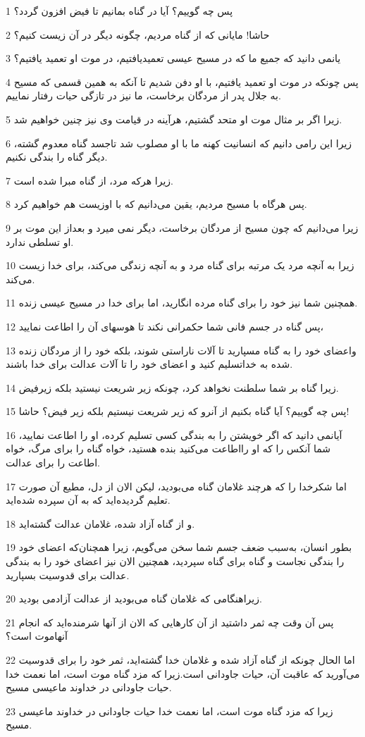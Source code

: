 \par 1 پس چه گوییم؟ آیا در گناه بمانیم تا فیض افزون گردد؟
\par 2 حاشا! مایانی که از گناه مردیم، چگونه دیگر در آن زیست کنیم؟
\par 3 یانمی دانید که جمیع ما که در مسیح عیسی تعمیدیافتیم، در موت او تعمید یافتیم؟
\par 4 پس چونکه در موت او تعمید یافتیم، با او دفن شدیم تا آنکه به همین قسمی که مسیح به جلال پدر از مردگان برخاست، ما نیز در تازگی حیات رفتار نماییم.
\par 5 زیرا اگر بر مثال موت او متحد گشتیم، هرآینه در قیامت وی نیز چنین خواهیم شد.
\par 6 زیرا این رامی دانیم که انسانیت کهنه ما با او مصلوب شد تاجسد گناه معدوم گشته، دیگر گناه را بندگی نکنیم.
\par 7 زیرا هر‌که مرد، از گناه مبرا شده است.
\par 8 پس هرگاه با مسیح مردیم، یقین می‌دانیم که با اوزیست هم خواهیم کرد.
\par 9 زیرا می‌دانیم که چون مسیح از مردگان برخاست، دیگر نمی میرد و بعداز این موت بر او تسلطی ندارد.
\par 10 زیرا به آنچه مرد یک مرتبه برای گناه مرد و به آنچه زندگی می‌کند، برای خدا زیست می‌کند.
\par 11 همچنین شما نیز خود را برای گناه مرده انگارید، اما برای خدا در مسیح عیسی زنده.
\par 12 پس گناه در جسم فانی شما حکمرانی نکند تا هوسهای آن را اطاعت نمایید،
\par 13 واعضای خود را به گناه مسپارید تا آلات ناراستی شوند، بلکه خود را از مردگان زنده شده به خداتسلیم کنید و اعضای خود را تا آلات عدالت برای خدا باشند.
\par 14 زیرا گناه بر شما سلطنت نخواهد کرد، چونکه زیر شریعت نیستید بلکه زیرفیض.
\par 15 پس چه گوییم؟ آیا گناه بکنیم از آنرو که زیر شریعت نیستیم بلکه زیر فیض؟ حاشا!
\par 16 آیانمی دانید که اگر خویشتن را به بندگی کسی تسلیم کرده، او را اطاعت نمایید، شما آنکس را که او رااطاعت می‌کنید بنده هستید، خواه گناه را برای مرگ، خواه اطاعت را برای عدالت.
\par 17 اما شکرخدا را که هرچند غلامان گناه می‌بودید، لیکن الان از دل، مطیع آن صورت تعلیم گردیده‌اید که به آن سپرده شده‌اید.
\par 18 و از گناه آزاد شده، غلامان عدالت گشته‌اید.
\par 19 بطور انسان، به‌سبب ضعف جسم شما سخن می‌گویم، زیرا همچنان‌که اعضای خود را بندگی نجاست و گناه برای گناه سپردید، همچنین الان نیز اعضای خود را به بندگی عدالت برای قدوسیت بسپارید.
\par 20 زیراهنگامی که غلامان گناه می‌بودید از عدالت آزادمی بودید.
\par 21 پس آن وقت چه ثمر داشتید از آن کارهایی که الان از آنها شرمنده‌اید که انجام آنهاموت است؟
\par 22 اما الحال چونکه از گناه آزاد شده و غلامان خدا گشته‌اید، ثمر خود را برای قدوسیت می‌آورید که عاقبت آن، حیات جاودانی است.زیرا که مزد گناه موت است، اما نعمت خدا حیات جاودانی در خداوند ماعیسی مسیح.
\par 23 زیرا که مزد گناه موت است، اما نعمت خدا حیات جاودانی در خداوند ماعیسی مسیح.

